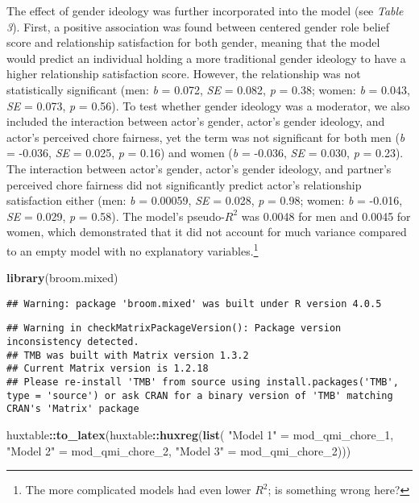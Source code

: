 \documentclass[
  english,
  man]{apa6}
\newenvironment{Shaded}{\begin{snugshade}}{\end{snugshade}}
\newcommand{\DecValTok}[1]{\textcolor[rgb]{0.00,0.00,0.81}{#1}}
\newcommand{\KeywordTok}[1]{\textcolor[rgb]{0.13,0.29,0.53}{\textbf{#1}}}
\newcommand{\NormalTok}[1]{#1}
\newcommand{\OperatorTok}[1]{\textcolor[rgb]{0.81,0.36,0.00}{\textbf{#1}}}
\newcommand{\StringTok}[1]{\textcolor[rgb]{0.31,0.60,0.02}{#1}}
\begin{document}
The effect of gender ideology was further incorporated into the model (see \emph{Table 3}). First, a positive association was found between centered gender role belief score and relationship satisfaction for both gender, meaning that the model would predict an individual holding a more traditional gender ideology to have a higher relationship satisfaction score. However, the relationship was not statistically significant (men: \emph{b} = 0.072, \emph{SE} = 0.082, \emph{p} = 0.38; women: \emph{b} = 0.043, \emph{SE} = 0.073, \emph{p} = 0.56). To test whether gender ideology was a moderator, we also included the interaction between actor's gender, actor's gender ideology, and actor's perceived chore fairness, yet the term was not significant for both men (\emph{b} = -0.036, \emph{SE} = 0.025, \emph{p} = 0.16) and women (\emph{b} = -0.036, \emph{SE} = 0.030, \emph{p} = 0.23). The interaction between actor's gender, actor's gender ideology, and partner's perceived chore fairness did not significantly predict actor's relationship satisfaction either (men: \emph{b} = 0.00059, \emph{SE} = 0.028, \emph{p} = 0.98; women: \emph{b} = -0.016, \emph{SE} = 0.029, \emph{p} = 0.58). The model's pseudo-\(R^2\) was 0.0048 for men and 0.0045 for women, which demonstrated that it did not account for much variance compared to an empty model with no explanatory variables.\footnote{The more complicated models had even lower \(R^2\); is something wrong here?}

\begin{Shaded}
\begin{Highlighting}[]
\KeywordTok{library}\NormalTok{(broom.mixed)}
\end{Highlighting}
\end{Shaded}

\begin{verbatim}
## Warning: package 'broom.mixed' was built under R version 4.0.5
\end{verbatim}

\begin{verbatim}
## Warning in checkMatrixPackageVersion(): Package version inconsistency detected.
## TMB was built with Matrix version 1.3.2
## Current Matrix version is 1.2.18
## Please re-install 'TMB' from source using install.packages('TMB', type = 'source') or ask CRAN for a binary version of 'TMB' matching CRAN's 'Matrix' package
\end{verbatim}

\begin{Shaded}
\begin{Highlighting}[]
\NormalTok{huxtable}\OperatorTok{::}\KeywordTok{to\_latex}\NormalTok{(huxtable}\OperatorTok{::}\KeywordTok{huxreg}\NormalTok{(}\KeywordTok{list}\NormalTok{(}
                 \StringTok{"Model 1"}\NormalTok{ =}\StringTok{ }\NormalTok{mod\_qmi\_chore\_}\DecValTok{1}\NormalTok{, }
                 \StringTok{"Model 2"}\NormalTok{ =}\StringTok{ }\NormalTok{mod\_qmi\_chore\_}\DecValTok{2}\NormalTok{,}
                 \StringTok{"Model 3"}\NormalTok{ =}\StringTok{ }\NormalTok{mod\_qmi\_chore\_}\DecValTok{2}\NormalTok{)))}
\end{Highlighting}
\end{Shaded}
\end{document}
